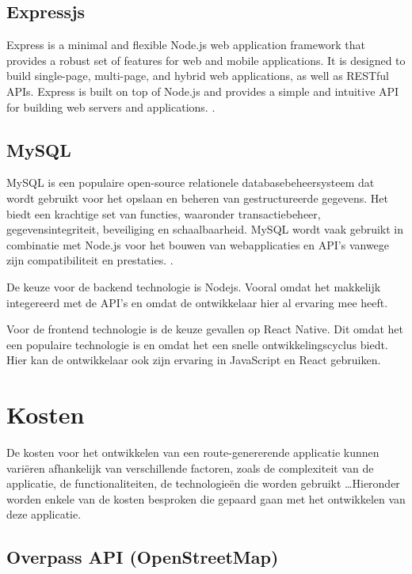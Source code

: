     \subsection{Expressjs}

    Express is a minimal and flexible Node.js web application framework that provides a robust set of features for web and mobile applications. 
    It is designed to build single-page, multi-page, and hybrid web applications, as well as RESTful APIs. Express is built on top of Node.js and provides a simple and intuitive API for building web servers and applications. \autocite{express_docs}.

    \subsection{MySQL}

    MySQL is een populaire open-source relationele databasebeheersysteem dat wordt gebruikt voor het opslaan en beheren van gestructureerde gegevens.
    Het biedt een krachtige set van functies, waaronder transactiebeheer, gegevensintegriteit, beveiliging en schaalbaarheid. MySQL wordt vaak gebruikt in combinatie met Node.js voor het bouwen van webapplicaties en API's vanwege zijn compatibiliteit en prestaties. 
    \autocite{mysql_docs}.

    \hspace{2cm}

    De keuze voor de backend technologie is Nodejs. Vooral omdat het makkelijk integereerd met de API's en omdat de ontwikkelaar hier al ervaring mee heeft.

    Voor de frontend technologie is de keuze gevallen op React Native. Dit omdat het een populaire technologie is en omdat het een snelle ontwikkelingscyclus biedt. 
    Hier kan de ontwikkelaar ook zijn ervaring in JavaScript en React gebruiken.

    \section{Kosten}

    De kosten voor het ontwikkelen van een route-genererende applicatie kunnen variëren afhankelijk van verschillende factoren, zoals de complexiteit van de applicatie, de functionaliteiten,
    de technologieën die worden gebruikt \ldots Hieronder worden enkele van de kosten besproken die gepaard gaan met het ontwikkelen van deze applicatie.

    \subsection{Overpass API (OpenStreetMap)}

